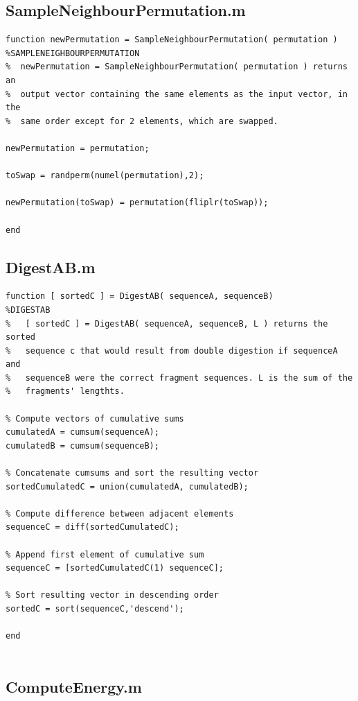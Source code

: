 \documentclass[12pt,A4,titlepage]{article}
\begin{document}
\subsection*{SampleNeighbourPermutation.m}

\begin{lstlisting}
function newPermutation = SampleNeighbourPermutation( permutation )
%SAMPLENEIGHBOURPERMUTATION
%  newPermutation = SampleNeighbourPermutation( permutation ) returns an
%  output vector containing the same elements as the input vector, in the
%  same order except for 2 elements, which are swapped.

newPermutation = permutation;

toSwap = randperm(numel(permutation),2);

newPermutation(toSwap) = permutation(fliplr(toSwap));

end
\end{lstlisting}

\subsection*{DigestAB.m}

\begin{lstlisting}
function [ sortedC ] = DigestAB( sequenceA, sequenceB)
%DIGESTAB
%   [ sortedC ] = DigestAB( sequenceA, sequenceB, L ) returns the sorted
%   sequence c that would result from double digestion if sequenceA and
%   sequenceB were the correct fragment sequences. L is the sum of the
%   fragments' lengthts.

% Compute vectors of cumulative sums
cumulatedA = cumsum(sequenceA);
cumulatedB = cumsum(sequenceB);

% Concatenate cumsums and sort the resulting vector
sortedCumulatedC = union(cumulatedA, cumulatedB);

% Compute difference between adjacent elements
sequenceC = diff(sortedCumulatedC);

% Append first element of cumulative sum
sequenceC = [sortedCumulatedC(1) sequenceC];

% Sort resulting vector in descending order
sortedC = sort(sequenceC,'descend');

end


\end{lstlisting}


\subsection*{ComputeEnergy.m}
\end{document}

